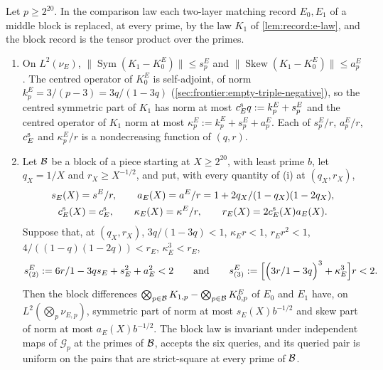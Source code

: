 \begin{lemma}\label{lem:record:exact-marginal-e}
Let $p\ge2^{20}$. In the comparison law each two-layer matching record $E_0,E_1$
of a middle block is replaced, at every prime, by the law $K_1$ of
\cref{lem:record:e-law}, and the block record is the tensor product over the
primes.
\begin{enumerate}[label=(\roman*)]
\item On $L^2(\nu_E)$, $\|\operatorname{Sym}(K_1-K^E_0)\|\le s^E_p$ and
 $\|\operatorname{Skew}(K_1-K^E_0)\|\le a^E_p$. The centred operator of $K^E_0$ is
 self-adjoint, of norm $k^E_p=3/(p-3)=3q/(1-3q)$
 (\cref{sec:frontier:empty-triple-negative}), so the centred symmetric part of
 $K_1$ has norm at most $c^{\rm s}_Eq:=k^E_p+s^E_p$ and the centred operator of
 $K_1$ norm at most $\kappa^E_p:=k^E_p+s^E_p+a^E_p$. Each of $s^E_p/r$, $a^E_p/r$,
 $c^{\rm s}_E$ and $\kappa^E_p/r$ is a nondecreasing function of $(q,r)$.
\item Let $\Blk$ be a block of a piece starting at $X\ge2^{20}$, with least prime
 $b$, let $q_X=1/X$ and $r_X\ge X^{-1/2}$, and put, with every quantity of (i) at
 $(q_X,r_X)$,
 \[
 \begin{gathered}
  s_E(X)=\frac{s^E}r,\qquad a_E(X)=\frac{a^E}r=\frac{1+2q_X}{(1-q_X)(1-2q_X)},\\
  c^{\rm s}_E(X)=c^{\rm s}_E,\qquad\kappa_E(X)=\frac{\kappa^E}r,\qquad
  r_E(X)=2c^{\rm s}_E(X)a_E(X).
 \end{gathered}
 \]
 Suppose that, at $(q_X,r_X)$, $3q/(1-3q)<1$, $\kappa_Er<1$, $r_Er^2<1$,
 $4/((1-q)(1-2q))<r_E$, $\kappa_E^3<r_E$,
 \[
  s^E_{(2)}:=\frac{6r}{1-3q}s_E+s_E^2+a_E^2<2\qquad\text{and}\qquad
  s^E_{(3)}:=\Bigl[\Bigl(\frac{3r}{1-3q}\Bigr)^3+\kappa_E^3\Bigr]r<2 .
 \]
 Then the block differences
 $\bigotimes_{p\in\Blk}K_{1,p}-\bigotimes_{p\in\Blk}K^E_{0,p}$ of $E_0$ and $E_1$ have,
 on $L^2(\bigotimes_p\nu_{E,p})$, symmetric part of norm at most $s_E(X)b^{-1/2}$ and
 skew part of norm at most $a_E(X)b^{-1/2}$. The block law is invariant under
 independent maps of $\mathcal G_p$ at the primes of $\Blk$, accepts the six queries,
 and its queried pair is uniform on the pairs that are strict-square at every
 prime of $\Blk$.
\end{enumerate}
\end{lemma}

